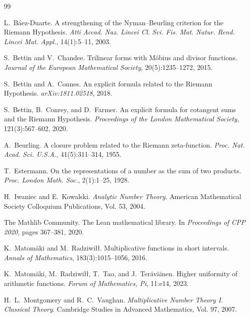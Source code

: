 \documentclass[11pt,a4paper]{article}
\theoremstyle{plain}
\theoremstyle{definition}
\theoremstyle{remark}
\begin{document}
\begin{thebibliography}{99}

L.~B\'aez-Duarte.
\newblock A strengthening of the {N}yman--{B}eurling criterion for the {R}iemann {H}ypothesis.
\newblock \emph{Atti Accad. Naz. Lincei Cl. Sci. Fis. Mat. Natur. Rend. Lincei Mat. Appl.}, 14(1):5--11, 2003.

S.~Bettin and V.~Chandee.
\newblock Trilinear forms with {M}\"obius and divisor functions.
\newblock \emph{Journal of the European Mathematical Society}, 20(5):1235--1272, 2015.

S.~Bettin and A.~Connes.
\newblock An explicit formula related to the {R}iemann {H}ypothesis.
\newblock \emph{arXiv:1811.02518}, 2018.

S.~Bettin, B.~Conrey, and D.~Farmer.
\newblock An explicit formula for cotangent sums and the {R}iemann {H}ypothesis.
\newblock \emph{Proceedings of the London Mathematical Society}, 121(3):567--602, 2020.

A.~Beurling.
\newblock A closure problem related to the {R}iemann zeta-function.
\newblock \emph{Proc. Nat. Acad. Sci. U.S.A.}, 41(5):311--314, 1955.

T.~Estermann.
\newblock On the representations of a number as the sum of two products.
\newblock \emph{Proc. London Math. Soc.}, 2(1):1--25, 1928.

H.~Iwaniec and E.~Kowalski.
\newblock \emph{Analytic Number Theory}.
\newblock American Mathematical Society Colloquium Publications, Vol. 53, 2004.

The {Mathlib} Community.
\newblock The {L}ean mathematical library.
\newblock In \emph{Proceedings of CPP 2020}, pages 367--381, 2020.

K.~Matom\"aki and M.~Radziwi\l\l.
\newblock Multiplicative functions in short intervals.
\newblock \emph{Annals of Mathematics}, 183(3):1015--1056, 2016.

K.~Matom\"aki, M.~Radziwi\l\l, T.~Tao, and J.~Ter\"av\"ainen.
\newblock Higher uniformity of arithmetic functions.
\newblock \emph{Forum of Mathematics, Pi}, 11:e14, 2023.

H.~L.~Montgomery and R.~C.~Vaughan.
\newblock \emph{Multiplicative Number Theory I. Classical Theory}.
\newblock Cambridge Studies in Advanced Mathematics, Vol. 97, 2007.


\end{thebibliography}
\end{document}
